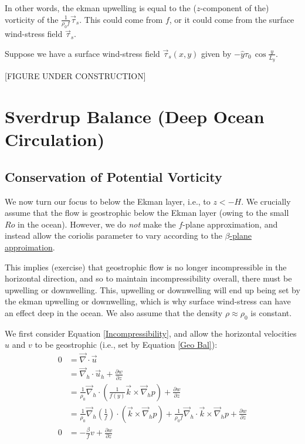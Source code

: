 In other words, the ekman upwelling is equal to the (\(z\)-component of the) vorticity of the \(\frac{1}{\rho_0 f}\vec{\tau}_s\). This could come from \(f\), or it could come from the surface wind-stress field \(\vec{\tau}_s\).

Suppose we have a surface wind-stress field \(\vec{\tau}_s(x,y)\) given by \(-\hat{y}\tau_0\,\cos\frac{y}{L_y}\). 

[FIGURE UNDER CONSTRUCTION]

\section{Sverdrup Balance (Deep Ocean Circulation)}\label{Sverdrup Balance}

\subsection{Conservation of Potential Vorticity}

We now turn our focus to below the Ekman layer, i.e., to \(z<-H\). We crucially assume that the flow is geostrophic below the Ekman layer (owing to the small \(Ro\) in the ocean). However, we do \textit{not} make the \(f\)-plane approximation, and instead allow the coriolis parameter to vary according to the \hyperref[beta plane box]{\(\beta\)-plane approimation}. 

This implies (exercise) that geostrophic flow is no longer incompressible in the horizontal direction, and so to maintain incompressibility overall, there must be upwelling or downwelling. This, upwelling or downwelling will end up being set by the ekman upwelling or downwelling, which is why surface wind-stress can have an effect deep in the ocean. We also assume that the density \(\rho\approx\rho_0\) is constant.

We first consider Equation \ref{Incompressibility}, and allow the horizontal velocities \(u\) and \(v\) to be geostrophic (i.e., set by Equation \ref{Geo Bal}):
\begin{align*}
    0 & = \vec{\nabla}\cdot\vec{u}
    \\
    &= \vec{\nabla}_h\cdot\vec{u}_h
    +\frac{\partial w}{\partial z}
    \\
    &= 
    \frac{1}{\rho_0}\vec{\nabla}_h\cdot\left( \frac{1}{f(y)}\vec{k}\times\vec{\nabla}_h p \right)+\frac{\partial w}{\partial z}
    \\
    &=
    \frac{1}{\rho_0}
    \vec{\nabla}_h\left( \frac{1}{f} \right)
    \cdot \left( \vec{k}\times\vec{\nabla}_h p \right)
    +
    \frac{1}{\rho_0 f}
    \vec{\nabla}_h
    \cdot \vec{k}\times\vec{\nabla}_h p
    +\frac{\partial w}{\partial z}
    \\
    0&=-\frac{\beta}{f}v+\frac{\partial w}{\partial z}
\end{align*}

